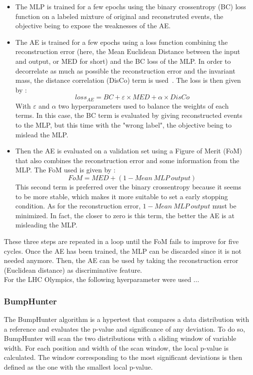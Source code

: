 \documentclass[letterpaper,11pt]{article}
\begin{document}
\begin{itemize}
	\item The MLP is trained for a few epochs using the binary crossentropy (BC) loss function on a labeled mixture of original and reconstruted events, the objective being to expose the weaknesses of the AE.
	
	\item The AE is trained for a few epochs using a loss function combining the reconstruction error (here, the Mean Euclidean Distance between the input and output, or MED for short) and the BC loss of the MLP.
	In order to decorrelate as much as possible the reconstruction error and the invariant mass, the distance correlation (DisCo) term is used~\cite{DiscoFever}.
	The loss is then given by :
	$$loss_{AE} = BC+\varepsilon\times MED+\alpha\times DisCo$$
	\noindent With $\varepsilon$ and $\alpha$ two hyperparameters used to balance the weights of each terms. In this case, the BC term is evaluated by giving reconstructed events to the MLP, but this time with the "wrong label", the objective being to mislead the MLP. 
	
	\item Then the AE is evaluated on a validation set using a Figure of Merit (FoM) that also combines the reconstruction error and some information from the MLP.
	The FoM used is given by :
	$$FoM = MED+(1-Mean~MLP~output)$$
	\noindent This second term is preferred over the binary crossentropy because it seems to be more stable, which makes it more suitable to set a early stopping condition.
	As for the reconstruction error, $1-Mean~MLP~output$ must be minimized.
	In fact, the closer to zero is this term, the better the AE is at misleading the MLP.
\end{itemize}

\noindent These three steps are repeated in a loop until the FoM fails to improve for five cycles. Once the AE has been trained, the MLP can be discarded since it is not needed anymore. Then, the AE can be used by taking the reconstruction error (Euclidean distance) as discriminative feature.\\

\noindent For the LHC Olympics, the following hyerparameter were used ...

\subsubsection{BumpHunter}
\label{sec:BH}

\noindent The BumpHunter algorithm is a hypertest that compares a data distribution with a reference and evaluates the p-value and significance of any deviation.
To do so, BumpHunter will scan the two distributions with a sliding window of variable width.
For each position and width of the scan window, the local p-value is calculated. The window corresponding to the most significant deviations is then defined as the one with the smallest local p-value.\\
\end{document}
